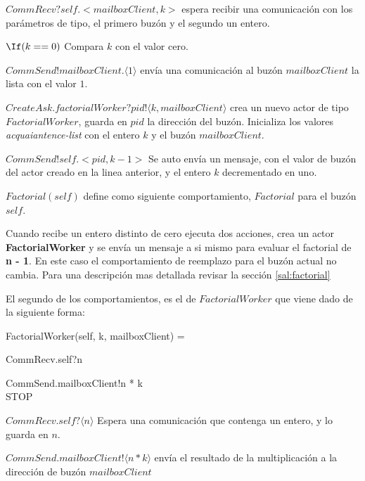 \begin{description}
 \item $CommRecv?self.<mailboxClient, k>$ espera recibir una comunicación con los parámetros de tipo, el primero buzón y el segundo un entero.
 \item $\If (k == 0)$ Compara $k$ con el valor cero.
 \item $CommSend!mailboxClient.\langle 1 \rangle$ envía una comunicación al buzón $mailboxClient$ la lista con el valor $1$.
 \item $CreateAsk.factorialWorker?pid!\langle k, mailboxClient \rangle$ crea un nuevo actor de tipo $FactorialWorker$, guarda en $pid$ la dirección del buzón. Inicializa los valores \textit{acquaiantence-list} con el entero $k$ y el buzón $mailboxClient$.
 \item $CommSend!self.<pid, k - 1 >$ Se auto envía un mensaje, con el valor de buzón del actor creado en la linea anterior, y el entero $k$ decrementado en uno.
 \item $Factorial(self)$ define como siguiente comportamiento, $Factorial$ para el buzón $self$.
\end{description}

Cuando recibe un entero distinto de cero ejecuta dos acciones, crea un actor \textbf{FactorialWorker} y se envía un mensaje a si mismo para evaluar el factorial de \textbf{n - 1}. En este caso el comportamiento de reemplazo para el buzón actual no cambia. Para una descripción mas detallada revisar la sección \ref{sal:factorial}

El segundo de los comportamientos, es el de $FactorialWorker$ que viene dado de la siguiente forma:

\begin{process}
FactorialWorker(self, k, mailboxClient) = {} \\ \quad
  \begin{block}
  CommRecv.self?\langle n \rangle \then {} \\ \quad
    \begin{block}
    CommSend.mailboxClient!\langle n * k \rangle \then \\
    STOP
    \end{block}
  \end{block}
\end{process}

\begin{description}
 \item $CommRecv.self?\langle n \rangle$ Espera una comunicación que contenga un entero, y lo guarda en $n$.
 \item $CommSend.mailboxClient!\langle n * k \rangle$ envía el resultado de la multiplicación a la dirección de buzón $mailboxClient$
\end{description}

